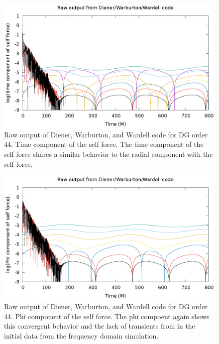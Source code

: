 \begin{figure}
  \includegraphics{rawTimeSelfForceModes}
  \caption{Raw output of Diener, Warburton, and Wardell code for DG order 44. Time component of the self force. The time component of the self force shares a similar behavior to the radial component with the self force.}
  \label{tsf}
\end{figure}

\begin{figure}
  \includegraphics{rawPhiSelfForceModes}
  \caption{Raw output of Diener, Warburton, and Wardell code for DG order 44. Phi component of the self force. The phi compoent again shows this convergent behavior and the lack of transients from in the initial data from the frequency domain simulation.}
  \label{phisf}
\end{figure}

